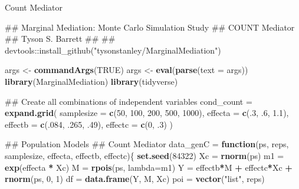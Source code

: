 \documentclass[]{DissertateUSU}
\newenvironment{Shaded}{\begin{snugshade}}{\end{snugshade}}
\newcommand{\KeywordTok}[1]{\textcolor[rgb]{0.13,0.29,0.53}{\textbf{#1}}}
\newcommand{\DataTypeTok}[1]{\textcolor[rgb]{0.13,0.29,0.53}{#1}}
\newcommand{\DecValTok}[1]{\textcolor[rgb]{0.00,0.00,0.81}{#1}}
\newcommand{\FloatTok}[1]{\textcolor[rgb]{0.00,0.00,0.81}{#1}}
\newcommand{\StringTok}[1]{\textcolor[rgb]{0.31,0.60,0.02}{#1}}
\newcommand{\OtherTok}[1]{\textcolor[rgb]{0.56,0.35,0.01}{#1}}
\newcommand{\ControlFlowTok}[1]{\textcolor[rgb]{0.13,0.29,0.53}{\textbf{#1}}}
\newcommand{\OperatorTok}[1]{\textcolor[rgb]{0.81,0.36,0.00}{\textbf{#1}}}
\newcommand{\NormalTok}[1]{#1}
\begin{document}
\normalsize

Count Mediator

\small

\begin{Shaded}
\begin{Highlighting}[]
\NormalTok{## Marginal Mediation: Monte Carlo Simulation Study}
\NormalTok{##   COUNT Mediator}
\NormalTok{## Tyson S. Barrett}
\NormalTok{##}
\NormalTok{## devtools::install_github("tysonstanley/MarginalMediation")}

\NormalTok{args <-}\StringTok{ }\KeywordTok{commandArgs}\NormalTok{(}\OtherTok{TRUE}\NormalTok{)}
\NormalTok{args <-}\StringTok{ }\KeywordTok{eval}\NormalTok{(}\KeywordTok{parse}\NormalTok{(}\DataTypeTok{text =}\NormalTok{ args))}
\KeywordTok{library}\NormalTok{(MarginalMediation)}
\KeywordTok{library}\NormalTok{(tidyverse)}

\NormalTok{## Create all combinations of independent variables}
\NormalTok{cond_count =}\StringTok{ }\KeywordTok{expand.grid}\NormalTok{(}
  \DataTypeTok{samplesize =} \KeywordTok{c}\NormalTok{(}\DecValTok{50}\NormalTok{, }\DecValTok{100}\NormalTok{, }\DecValTok{200}\NormalTok{, }\DecValTok{500}\NormalTok{, }\DecValTok{1000}\NormalTok{),}
  \DataTypeTok{effecta    =} \KeywordTok{c}\NormalTok{(.}\DecValTok{3}\NormalTok{, .}\DecValTok{6}\NormalTok{, }\FloatTok{1.1}\NormalTok{),}
  \DataTypeTok{effectb    =} \KeywordTok{c}\NormalTok{(.}\DecValTok{084}\NormalTok{, .}\DecValTok{265}\NormalTok{, .}\DecValTok{49}\NormalTok{),}
  \DataTypeTok{effectc    =} \KeywordTok{c}\NormalTok{(}\DecValTok{0}\NormalTok{, .}\DecValTok{3}\NormalTok{)}
\NormalTok{)}

\NormalTok{## Population Models}
\NormalTok{## Count Mediator}
\NormalTok{data_genC =}\StringTok{ }\ControlFlowTok{function}\NormalTok{(ps, reps, samplesize, effecta, effectb, effectc)\{}
  \KeywordTok{set.seed}\NormalTok{(}\DecValTok{84322}\NormalTok{)}
\NormalTok{  Xc =}\StringTok{ }\KeywordTok{rnorm}\NormalTok{(ps)}
\NormalTok{  m1 =}\StringTok{ }\KeywordTok{exp}\NormalTok{(effecta }\OperatorTok{*}\StringTok{ }\NormalTok{Xc)}
\NormalTok{  M  =}\StringTok{ }\KeywordTok{rpois}\NormalTok{(ps, }\DataTypeTok{lambda=}\NormalTok{m1)}
\NormalTok{  Y  =}\StringTok{ }\NormalTok{effectb}\OperatorTok{*}\NormalTok{M }\OperatorTok{+}\StringTok{ }\NormalTok{effectc}\OperatorTok{*}\NormalTok{Xc }\OperatorTok{+}\StringTok{ }\KeywordTok{rnorm}\NormalTok{(ps, }\DecValTok{0}\NormalTok{, }\DecValTok{1}\NormalTok{)}
\NormalTok{  df =}\StringTok{ }\KeywordTok{data.frame}\NormalTok{(Y, M, Xc)}
\NormalTok{  poi  =}\StringTok{ }\KeywordTok{vector}\NormalTok{(}\StringTok{"list"}\NormalTok{, reps)}
  

\end{Highlighting}
\end{Shaded}
\end{document}
